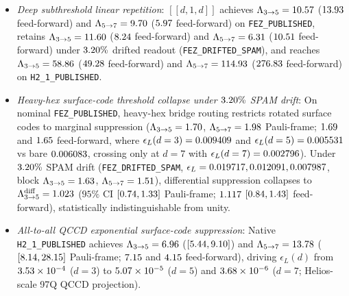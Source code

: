 \documentclass[aps,prx,twocolumn,superscriptaddress,nofootinbib]{revtex4-2}
\begin{document}
\begin{itemize}
  \item \emph{Deep subthreshold linear repetition}: $[[d,1,d]]$ achieves $\Lambda_{3\to 5} = 10.57$ ($13.93$ feed-forward) and $\Lambda_{5\to 7} = 9.70$ ($5.97$ feed-forward) on \texttt{FEZ\_PUBLISHED}, retains $\Lambda_{3\to 5} = 11.60$ ($8.24$ feed-forward) and $\Lambda_{5\to 7} = 6.31$ ($10.51$ feed-forward) under $3.20\%$ drifted readout (\texttt{FEZ\_DRIFTED\_SPAM}), and reaches $\Lambda_{3\to 5} = 58.86$ ($49.28$ feed-forward) and $\Lambda_{5\to 7} = 114.93$ ($276.83$ feed-forward) on \texttt{H2\_1\_PUBLISHED}.
  \item \emph{Heavy-hex surface-code threshold collapse under $3.20\%$ SPAM drift}: On nominal \texttt{FEZ\_PUBLISHED}, heavy-hex bridge routing restricts rotated surface codes to marginal suppression ($\Lambda_{3\to 5} = 1.70$, $\Lambda_{5\to 7} = 1.98$ Pauli-frame; $1.69$ and $1.65$ feed-forward, where $\epsilon_L(d=3) = 0.009409$ and $\epsilon_L(d=5) = 0.005531$ vs bare $0.006083$, crossing only at $d = 7$ with $\epsilon_L(d=7) = 0.002796$). Under $3.20\%$ SPAM drift (\texttt{FEZ\_DRIFTED\_SPAM}, $\epsilon_L = 0.019717, 0.012091, 0.007987$, block $\Lambda_{3\to 5} = 1.63$, $\Lambda_{5\to 7} = 1.51$), differential suppression collapses to $\Lambda_{3\to 5}^{\mathrm{diff}} = 1.023$ ($95\%$ CI $[0.74, 1.33]$ Pauli-frame; $1.117$ $[0.84, 1.43]$ feed-forward), statistically indistinguishable from unity.
  \item \emph{All-to-all QCCD exponential surface-code suppression}: Native \texttt{H2\_1\_PUBLISHED} achieves $\Lambda_{3\to 5} = 6.96$ ($[5.44, 9.10]$) and $\Lambda_{5\to 7} = 13.78$ ($[8.14, 28.15]$ Pauli-frame; $7.15$ and $4.15$ feed-forward), driving $\epsilon_L(d)$ from $3.53 \times 10^{-4}$ ($d = 3$) to $5.07 \times 10^{-5}$ ($d = 5$) and $3.68 \times 10^{-6}$ ($d = 7$; Helios-scale 97Q QCCD projection).
\end{itemize}
\end{document}
